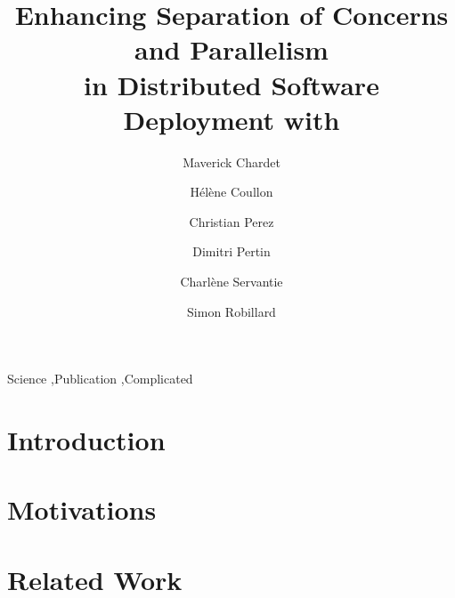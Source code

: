 \documentclass[5p]{elsarticle}
\begin{document}
\begin{frontmatter}

  \title{Enhancing Separation of Concerns and Parallelism\\ in
    Distributed Software Deployment with \mad}

  \author[label1]{Maverick Chardet}
  \author[label1]{Hélène Coullon}
  \author[label2]{Christian Perez}
  \author[label1]{Dimitri Pertin}
  \author[label1]{Charlène Servantie}
  \author[label1]{Simon Robillard}

\address[label1]{IMT Atlantique, Inria, LS2N, UBL, F-44307 Nantes, France}
\address[label2]{Univ Lyon, Inria, EnsL, UCBL, CNRS, LIP, Lyon, France}


\begin{abstract}
\end{abstract}

\begin{keyword}
Science \sep Publication \sep Complicated
\end{keyword}

\end{frontmatter}


\section{Introduction}
\label{sec:introduction}


\section{Motivations}
\label{sec:motivation}


\section{Related Work}
\label{sec:related_work}

\end{document}
